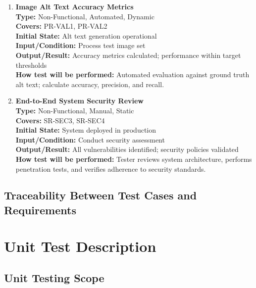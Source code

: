 \documentclass[12pt, titlepage]{article}
\begin{document}
\begin{enumerate}[label=NFR-ST \arabic*., wide=0pt, leftmargin=*]
  \item \textbf{Image Alt Text Accuracy Metrics} \\[2mm]
    \textbf{Type:} Non-Functional, Automated, Dynamic \\
    \textbf{Covers:} PR-VAL1, PR-VAL2 \\
    \textbf{Initial State:} Alt text generation operational \\
    \textbf{Input/Condition:} Process test image set \\
    \textbf{Output/Result:} Accuracy metrics calculated; performance
    within target thresholds \\[2mm]
    \textbf{How test will be performed:} Automated evaluation against
    ground truth alt text; calculate accuracy, precision, and recall.

  \item \textbf{End-to-End System Security Review} \\[2mm]
    \textbf{Type:} Non-Functional, Manual, Static \\
    \textbf{Covers:} SR-SEC3, SR-SEC4 \\
    \textbf{Initial State:} System deployed in production \\
    \textbf{Input/Condition:} Conduct security assessment \\
    \textbf{Output/Result:} All vulnerabilities identified; security
    policies validated \\[2mm]
    \textbf{How test will be performed:} Tester reviews system
    architecture, performs penetration tests, and verifies adherence
    to security standards.\\

\end{enumerate}

\subsection{Traceability Between Test Cases and Requirements}


\section{Unit Test Description}
\label{Unit Test Desc}


\subsection{Unit Testing Scope}
\end{document}
